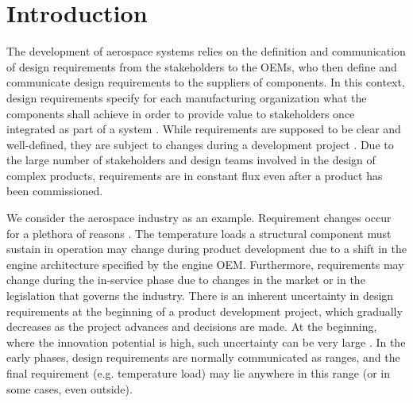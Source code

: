 \chapter{Introduction}
\label{ch:intro}

The development of aerospace systems relies on the definition and communication of design requirements from the stakeholders to the \acp{OEM}, who then define and communicate design requirements to the suppliers of components. In this context, design requirements specify for each manufacturing organization what the components shall achieve in order to provide value to stakeholders once integrated as part of a system \cite{Blanchard1981}. While requirements are supposed to be clear and well-defined, they are subject to changes during a development project \cite{Peterson2007}. Due to the large number of stakeholders and design teams involved in the design of complex products, requirements are in constant flux even after a product has been commissioned. 

We consider the aerospace industry as an example. Requirement changes occur for a plethora of reasons \cite{Boeing2013,Eckert2004}. The temperature loads a structural component must sustain in operation may change during product development due to a shift in the engine architecture specified by the engine \ac{OEM}. Furthermore, requirements may change during the in-service phase due to changes in the market or in the legislation that governs the industry. There is an inherent uncertainty in design requirements at the beginning of a product development project, which gradually decreases as the project advances and decisions are made. At the beginning, where the innovation potential is high, such uncertainty can be very large \cite{ullman2009mechanical}. In the early phases, design requirements are normally communicated as ranges, and the final requirement (e.g. temperature load) may lie anywhere in this range (or in some cases, even outside).

